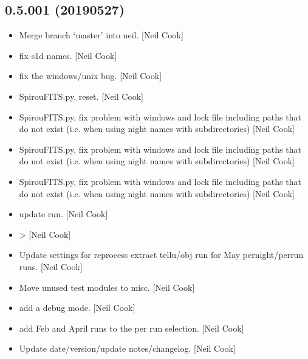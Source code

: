\documentclass[a4paper,10pt,english]{report}
\begin{document}
\subsection{0.5.001 (2019\sphinxhyphen{}05\sphinxhyphen{}27)}
\label{\detokenize{misc/changelog:id155}}\begin{itemize}
\item {} 
Merge branch ‘master’ into neil. {[}Neil Cook{]}

\item {} 
 \sphinxhyphen{} fix s1d names. {[}Neil Cook{]}

\item {} 
 \sphinxhyphen{} fix the windows/unix  bug. {[}Neil Cook{]}

\item {} 
SpirouFITS.py,  \sphinxhyphen{} reset. {[}Neil Cook{]}

\item {} 
SpirouFITS.py,  \sphinxhyphen{} fix problem with windows and lock file
including paths that do not exist (i.e. when using night names with
sub\sphinxhyphen{}directories) {[}Neil Cook{]}

\item {} 
SpirouFITS.py,  \sphinxhyphen{} fix problem with windows and lock file
including paths that do not exist (i.e. when using night names with
sub\sphinxhyphen{}directories) {[}Neil Cook{]}

\item {} 
SpirouFITS.py,  \sphinxhyphen{} fix problem with windows and lock file
including paths that do not exist (i.e. when using night names with
sub\sphinxhyphen{}directories) {[}Neil Cook{]}

\item {} 
 \sphinxhyphen{} update run. {[}Neil Cook{]}

\item {} 
 \sphinxhyphen{}  \textendash{}\textgreater{}  {[}Neil Cook{]}

\item {} 
Update settings for reprocess extract tellu/obj run for May
pernight/perrun runs. {[}Neil Cook{]}

\item {} 
Move unused test modules to misc. {[}Neil Cook{]}

\item {} 
 \sphinxhyphen{} add a debug mode. {[}Neil Cook{]}

\item {} 
 \sphinxhyphen{} add Feb and April runs to the per
run selection. {[}Neil Cook{]}

\item {} 
Update date/version/update notes/changelog. {[}Neil Cook{]}

\end{itemize}
\end{document}
